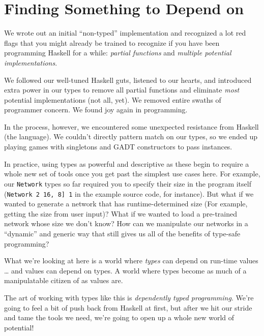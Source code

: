 \documentclass[]{article}
\begin{document}
\section{Finding Something to Depend
on}\label{finding-something-to-depend-on}

We wrote out an initial ``non-typed'' implementation and recognized a
lot red flags that you might already be trained to recognize if you have
been programming Haskell for a while: \emph{partial functions} and
\emph{multiple potential implementations}.

We followed our well-tuned Haskell guts, listened to our hearts, and
introduced extra power in our types to remove all partial functions and
eliminate \emph{most} potential implementations (not all, yet). We
removed entire swaths of programmer concern. We found joy again in
programming.

In the process, however, we encountered some unexpected resistance from
Haskell (the language). We couldn't directly pattern match on our types,
so we ended up playing games with singletons and GADT constructors to
pass instances.

In practice, using types as powerful and descriptive as these begin to
require a whole new set of tools once you get past the simplest use
cases here. For example, our \texttt{Network} types so far required you
to specify their size in the program itself
(\texttt{Network\ 2\ \textquotesingle{}{[}16,\ 8{]}\ 1} in the example
source code, for instance). But what if we wanted to generate a network
that has runtime-determined size (For example, getting the size from
user input)? What if we wanted to load a pre-trained network whose size
we don't know? How can we manipulate our networks in a ``dynamic'' and
generic way that still gives us all of the benefits of type-safe
programming?

What we're looking at here is a world where \emph{types} can depend on
run-time values \ldots{} and values can depend on types. A world where
types become as much of a manipulatable citizen of as values are.

The art of working with types like this is \emph{dependently typed
programming}. We're going to feel a bit of push back from Haskell at
first, but after we hit our stride and tame the tools we need, we're
going to open up a whole new world of potential!
\end{document}
